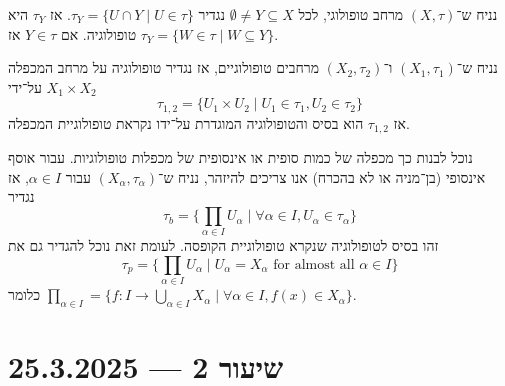 \begin{proposition}
	נניח ש־$(X, \tau)$ מרחב טופולוגי, לכל $\emptyset \ne Y \subseteq X$ נגדיר $\tau_Y = \{ U \cap Y \mid U \in \tau \}$.
	אז $\tau_Y$ היא טופולוגיה.
	אם $Y \in \tau$ אז $\tau_Y = \{ W \in \tau \mid W \subseteq Y \}$.
\end{proposition}
\begin{proposition}
	נניח ש־$(X_1, \tau_1)$ ו־$(X_2, \tau_2)$ מרחבים טופולוגיים, אז נגדיר טופולוגיה על מרחב המכפלה $X_1 \times X_2$ על־ידי
	\[
		\tau_{1, 2}
		= \{ U_1 \times U_2 \mid U_1 \in \tau_1, U_2 \in \tau_2 \}
	\]
	אז $\tau_{1, 2}$ הוא בסיס והטופולוגיה המוגדרת על־ידו נקראת טופולוגיית המכפלה.
\end{proposition}
\begin{example}
	נוכל לבנות כך מכפלה של כמות סופית או אינסופית של מכפלות טופולוגיות.
	עבור אוסף אינסופי (בן־מניה או לא בהכרח) אנו צריכים להיזהר, נניח ש־$(X_\alpha, \tau_\alpha)$ עבור $\alpha \in I$, אז נגדיר
	\[
		\tau_b = \{ \prod_{\alpha \in I} U_\alpha \mid \forall \alpha \in I, U_\alpha \in \tau_\alpha \}
	\]
	זהו בסיס לטופולוגיה שנקרא טופולוגיית הקופסה.
	לעומת זאת נוכל להגדיר גם את
	\[
		\tau_p
		= \{ \prod_{\alpha \in I} U_\alpha \mid U_\alpha = X_\alpha \text{ for almost all } \alpha \in I \}
	\]
	כלומר $\prod_{\alpha \in I} = \{ f : I \to \bigcup_{\alpha \in I} X_\alpha \mid \forall \alpha \in I, f(x) \in X_\alpha \}$.
\end{example}

\section{שיעור 2 --- 25.3.2025}
